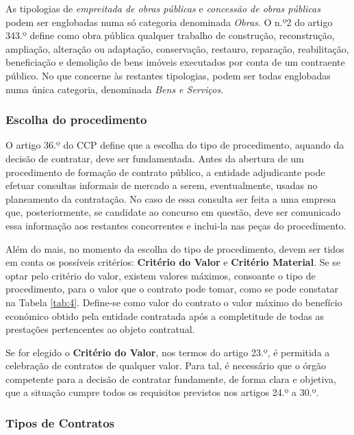 As tipologias de \textit{empreitada de obras públicas} e \textit{concessão de obras públicas} podem ser englobadas numa só categoria denominada \textit{Obras}. O n.º2 do artigo 343.º define como obra pública qualquer trabalho de construção, reconstrução, ampliação, alteração ou adaptação, conservação, restauro, reparação, reabilitação, beneficiação e demolição de bens imóveis executados por conta de um contraente público.
No que concerne às restantes tipologias, podem ser todas englobadas numa única categoria, denominada \textit{Bens e Serviços}. 




\subsubsection{Escolha do procedimento}

O artigo 36.º do CCP define que a escolha do tipo de procedimento, aquando da decisão de contratar, deve ser fundamentada. Antes da abertura de um procedimento de formação de contrato público, a entidade adjudicante pode efetuar consultas informais de mercado a serem, eventualmente, usadas no planeamento da contratação. No caso de essa consulta ser feita a uma empresa que, posteriormente, se candidate ao concurso em questão, deve ser comunicado essa informação aos restantes concorrentes e inclui-la nas peças do procedimento. 

Além do mais, no momento da escolha do tipo de procedimento, devem ser tidos em conta os possíveis critérios: \textbf{Critério do Valor} e \textbf{Critério Material}. 
Se se optar pelo critério do valor, existem valores máximos, consoante o tipo de procedimento, para o valor que o contrato pode tomar, como se pode constatar na Tabela \ref{tab:4}. Define-se como valor do contrato o valor máximo do benefício económico obtido pela entidade contratada após a completitude de todas as prestações pertencentes ao objeto contratual.

Se for elegido o \textbf{Critério do Valor}, nos termos do artigo 23.º, é permitida a celebração de contratos de qualquer valor. Para tal, é necessário que o órgão competente para a decisão de contratar fundamente, de forma clara e objetiva, que a situação cumpre todos os requisitos previstos nos artigos 24.º a 30.º.

\subsubsection{Tipos de Contratos}


